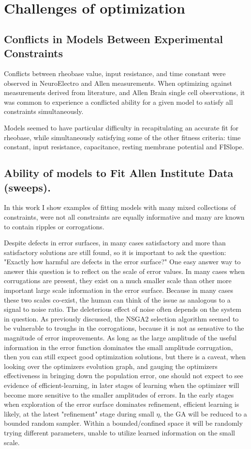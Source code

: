 \section{Challenges of optimization}
\subsection{Conflicts in Models Between Experimental Constraints}

Conflicts between rheobase value, input resistance, and time constant  were observed in NeuroElectro and Allen measurements. When optimizing against measurements derived from literature, and Allen Brain single cell observations, it was common to experience a conflicted ability for a given model to satisfy all constraints simultaneously. 

Models seemed to have particular difficulty in recapitulating an accurate fit for rheobase, while simultaneously satisfying some of the other fitness criteria: time constant, input resistance, capacitance, resting membrane potential and FISlope. 


\subsection{Ability of models to Fit Allen Institute Data (sweeps).}

In this work I show examples of fitting models with many mixed collections of constraints, were not all constraints are equally informative and many are known to contain ripples or corrogations.

Despite defects in error surfaces, in many cases satisfactory and more than satisfactory solutions are still found, so it is important to ask the question: "Exactly how harmful are defects in the error surface?" One easy answer way to answer this question is to reflect on the scale of error values. In many cases when corrugations are present, they exist on a much smaller scale than other more important large scale information in the error surface. Because in many cases these two scales co-exist, the human can think of the issue as analogous to a signal to noise ratio. The deleterious effect of noise often depends on the system in question. As previously discussed, the NSGA2 selection algorithm seemed to be vulnerable to troughs in the corrogations, because it is not as sensative to the magnitude of error improvements. As long as the large amplitude of the useful information in the error function dominates the small amplitude corrugation, then you can still expect good optimization solutions, but there is a caveat, when looking over the optimizers evolution graph, and gauging the optimizers effectiveness in bringing down the population error, one should not expect to see evidence of efficient-learning, in later stages of learning when the optimizer will become more sensitive to the smaller amplitudes of errors. In the early stages when exploration of the error surface dominates refinement, efficient learning is likely, at the latest "refinement" stage during small $\eta$, the GA will be reduced to a bounded random sampler. Within a bounded/confined space it will be randomly trying different parameters, unable to utilize learned information on the small scale.


